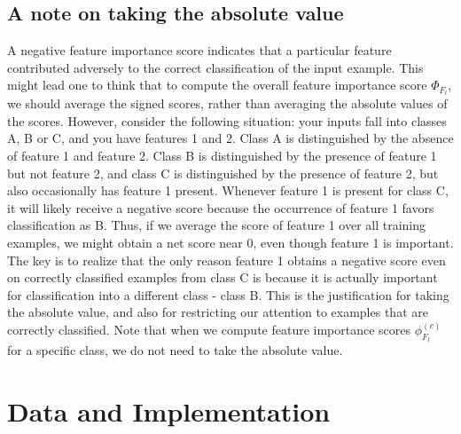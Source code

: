 \documentclass{article}
\begin{document}
\subsection{A note on taking the absolute value}
A negative feature importance score indicates that a particular feature contributed adversely to the correct classification of the input example. This might lead one to think that to compute the overall feature importance score $\Phi_{F_l}$, we should average the signed scores, rather than averaging the absolute values of the scores. However, consider the following situation: your inputs fall into classes A, B or C, and you have features 1 and 2. Class A is distinguished by the absence of feature 1 and feature 2. Class B is distinguished by the presence of feature 1 but not feature 2, and class C is distinguished by the presence of feature 2, but also occasionally has feature 1 present. Whenever feature 1 is present for class C, it will likely receive a negative score because the occurrence of feature 1 favors classification as B. Thus, if we average the score of feature 1 over all training examples, we might obtain a net score near 0, even though feature 1 is important. The key is to realize that the only reason feature 1 obtains a negative score even on correctly classified examples from class C is because it is actually important for classification into a different class - class B. This is the justification for taking the absolute value, and also for restricting our attention to examples that are correctly classified. Note that when we compute feature importance scores $\phi^{(c)}_{F_l}$ for a specific class, we do not need to take the absolute value.

\section{Data and Implementation}
\end{document}
